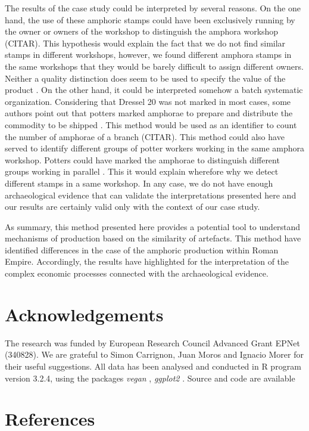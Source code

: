 \documentclass[review]{elsarticle}
\begin{document}

The results of the case study could be interpreted by several reasons. On the one hand, the use of these amphoric stamps could have been exclusively running by the owner or owners of the workshop to distinguish the amphora workshop (CITAR). This hypothesis would explain the fact that we do not find similar stamps in different workshops, however, we found different amphora stamps in the same workshops that they would be barely difficult to assign different owners. Neither a quality distinction does seem to be used to specify the value of the product \citep{callender}. On the other hand, it could be interpreted somehow a batch systematic organization. Considering that Dressel 20 was not marked in most cases, some authors point out that potters marked amphorae to prepare and distribute the commodity to be shipped \citep{berni_millet_epigrafianforica_2008}. This method would be used as an identifier to count the number of amphorae of a branch (CITAR). This method could also have served to identify different groups of potter workers working in the same amphora workshop. Potters could have marked the amphorae to distinguish different groups working in parallel \citep{li_crossbows_2014}. This it would explain wherefore why we detect different stamps in a same workshop. 
In any case, we do not have enough archaeological evidence that can validate the interpretations presented here and our results are certainly valid only with the context of our case study. 

As summary, this method presented here provides a potential tool to understand mechanisms of production based on the similarity of artefacts. This method have identified differences in the case of the amphoric production within Roman Empire. Accordingly, the results have highlighted for the interpretation of the complex economic processes connected with the archaeological evidence. 



\section{Acknowledgements}
The research was funded by European Research Council Advanced Grant EPNet (340828). We are grateful to Simon Carrignon, Juan Moros and Ignacio Morer for their useful suggestions.  
All data has been analysed and conducted in R program version 3.2.4, using the packages \textit{vegan} \citep{oksanen_vegan_2007}, \textit{ggplot2} \citep{ggplot2:_2016}. Source and code are available 


\section{References}


\end{document}

